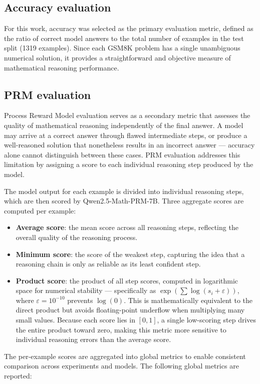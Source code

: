 \subsection{Accuracy evaluation}
For this work, accuracy was selected as the primary evaluation
  metric, defined as the ratio of correct model answers to the
  total number of examples in the test split (1319 examples). Since
  each GSM8K problem has a single unambiguous numerical solution,
  it provides a straightforward and objective measure of
  mathematical reasoning performance.

\subsection{PRM evaluation}
Process Reward Model evaluation serves as a secondary metric
  that assesses the quality of mathematical reasoning
  independently of the final answer. A model may arrive at a
  correct answer through flawed intermediate steps, or produce
  a well-reasoned solution that nonetheless results in an
  incorrect answer --- accuracy alone cannot distinguish between
  these cases. PRM evaluation addresses this limitation by
  assigning a score to each individual reasoning step produced
  by the model.

  The model output for each example is divided into individual
  reasoning steps, which are then scored by Qwen2.5-Math-PRM-7B.
  Three aggregate scores are computed per example:

  \begin{itemize}
      \item \textbf{Average score}: the mean score across all
      reasoning steps, reflecting the overall quality of the
      reasoning process.
      \item \textbf{Minimum score}: the score of the weakest
      step, capturing the idea that a reasoning chain is only
      as reliable as its least confident step.
     \item \textbf{Product score}: the product of all step
  scores, computed in logarithmic space for
  numerical stability --- specifically as
  $\exp\!\left(\sum \log(s_i + \varepsilon)\right)$,
  where $\varepsilon = 10^{-10}$ prevents
  $\log(0)$. This is mathematically equivalent
  to the direct product but avoids floating-point
  underflow when multiplying many small values.
  Because each score lies in $[0, 1]$, a single
  low-scoring step drives the entire product
  toward zero, making this metric more sensitive
  to individual reasoning errors than the average
  score.
  \end{itemize}
  The per-example scores are aggregated into global
  metrics to enable consistent comparison across
  experiments and models. The following global metrics
  are reported:

